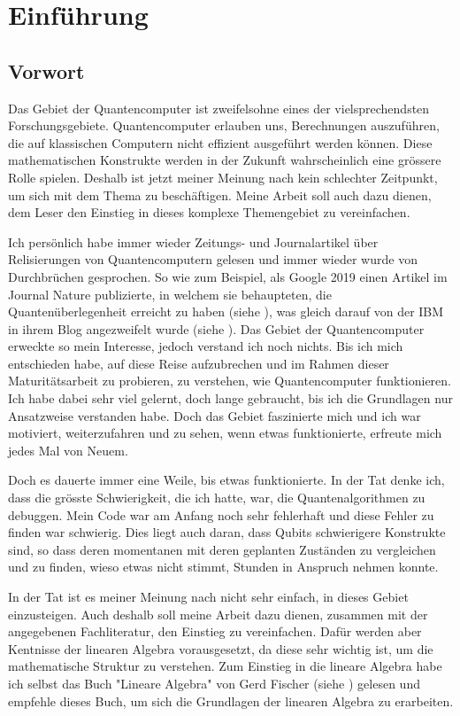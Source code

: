 \chapter{Einführung}
\section{Vorwort}
Das Gebiet der Quantencomputer ist zweifelsohne eines der vielsprechendsten Forschungsgebiete. Quantencomputer erlauben uns, Berechnungen auszuführen, die auf klassischen Computern nicht effizient ausgeführt werden können. Diese mathematischen Konstrukte werden in der Zukunft wahrscheinlich eine grössere Rolle spielen. Deshalb ist jetzt meiner Meinung nach kein schlechter Zeitpunkt, um sich mit dem Thema zu beschäftigen. Meine Arbeit soll auch dazu dienen, dem Leser den Einstieg in dieses komplexe Themengebiet zu vereinfachen. 

Ich persönlich habe immer wieder Zeitungs- und Journalartikel über Relisierungen von Quantencomputern gelesen und immer wieder wurde von Durchbrüchen gesprochen. So wie zum Beispiel, als Google 2019 einen Artikel im Journal \grqq Nature\grqq{} publizierte, in welchem sie behaupteten, die \grqq Quantenüberlegenheit\grqq{} erreicht zu haben (siehe \cite{GSP}), was gleich darauf von der IBM in ihrem Blog angezweifelt wurde (siehe \cite{IBM}). Das Gebiet der Quantencomputer erweckte so mein Interesse, jedoch verstand ich noch nichts. Bis ich mich entschieden habe, auf diese \grqq Reise\grqq{} aufzubrechen und im Rahmen dieser Maturitätsarbeit zu probieren, zu verstehen, wie Quantencomputer funktionieren. Ich habe dabei sehr viel gelernt, doch lange gebraucht, bis ich die Grundlagen nur Ansatzweise verstanden habe. Doch das Gebiet faszinierte mich und ich war motiviert, weiterzufahren und zu sehen, wenn etwas funktionierte, erfreute mich jedes Mal von Neuem. 

Doch es dauerte immer eine Weile, bis etwas funktionierte. In der Tat denke ich, dass die grösste Schwierigkeit, die ich hatte, war, die Quantenalgorithmen zu debuggen. Mein Code war am Anfang noch sehr fehlerhaft und diese Fehler zu finden war schwierig. Dies liegt auch daran, dass Qubits schwierigere Konstrukte sind, so dass deren momentanen mit deren geplanten Zuständen zu vergleichen und zu finden, wieso etwas nicht stimmt, Stunden in Anspruch nehmen konnte.

In der Tat ist es meiner Meinung nach nicht sehr einfach, in dieses Gebiet einzusteigen. Auch deshalb soll meine Arbeit dazu dienen, zusammen mit der angegebenen Fachliteratur, den Einstieg zu vereinfachen. Dafür werden aber Kentnisse der linearen Algebra vorausgesetzt, da diese sehr wichtig ist, um die mathematische Struktur zu verstehen. Zum Einstieg in die lineare Algebra habe ich selbst das Buch "Lineare Algebra" von Gerd Fischer (siehe \cite{LA}) gelesen und empfehle dieses Buch, um sich die Grundlagen der linearen Algebra zu erarbeiten.

